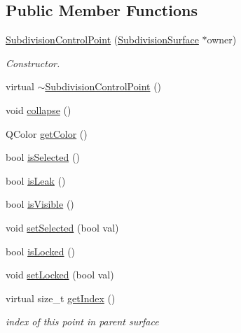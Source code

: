 \subsection*{Public Member Functions}
\begin{DoxyCompactItemize}
\item 
\hyperlink{classShipCADGeometry_1_1SubdivisionControlPoint_a812f4e2343926ef41bc7104f0f7b1dd9}{Subdivision\-Control\-Point} (\hyperlink{classShipCADGeometry_1_1SubdivisionSurface}{Subdivision\-Surface} $\ast$owner)
\begin{DoxyCompactList}\small\item\em Constructor. \end{DoxyCompactList}\item 
virtual \hyperlink{classShipCADGeometry_1_1SubdivisionControlPoint_aed35211e2f60cd5ed1de628d732e4791}{$\sim$\-Subdivision\-Control\-Point} ()
\item 
void \hyperlink{classShipCADGeometry_1_1SubdivisionControlPoint_a3c11cf5f0a22b44cbc8674a5d82942b0}{collapse} ()
\item 
Q\-Color \hyperlink{classShipCADGeometry_1_1SubdivisionControlPoint_ad3af0386e8bb679a2037054ddbdb6a20}{get\-Color} ()
\item 
bool \hyperlink{classShipCADGeometry_1_1SubdivisionControlPoint_af446fc02c7dc2e20383e741f71f4c358}{is\-Selected} ()
\item 
bool \hyperlink{classShipCADGeometry_1_1SubdivisionControlPoint_a1d9150cdde6105519de95a94689faa51}{is\-Leak} ()
\item 
bool \hyperlink{classShipCADGeometry_1_1SubdivisionControlPoint_ad739bf09eb693c8956101d0576736239}{is\-Visible} ()
\item 
void \hyperlink{classShipCADGeometry_1_1SubdivisionControlPoint_a5642f57c7f17e78c27ad6edb0fdb7f65}{set\-Selected} (bool val)
\item 
bool \hyperlink{classShipCADGeometry_1_1SubdivisionControlPoint_aaaa65fafa27eb876db3b1d5fc646aba8}{is\-Locked} ()
\item 
void \hyperlink{classShipCADGeometry_1_1SubdivisionControlPoint_a5f2cde3c54ca44c4b4d3ded0e3bc4ded}{set\-Locked} (bool val)
\item 
virtual size\-\_\-t \hyperlink{classShipCADGeometry_1_1SubdivisionControlPoint_a13c569f0894ba6193a3abf894bc4b517}{get\-Index} ()
\begin{DoxyCompactList}\small\item\em index of this point in parent surface \end{DoxyCompactList}\item 

\end{DoxyCompactItemize}
